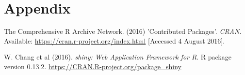 \documentclass[12pt]{article} %
\begin{document}
\clearpage

\section*{Appendix}

\begin{thebibliography}{59}
\begin{singlespace}

The Comprehensive R Archive Network. (2016) 'Contributed Packages'. \emph{CRAN}.
Available: \url{https://cran.r-project.org/index.html} 
[Accessed 4 August 2016].

W. Chang et al (2016).
\emph{shiny: Web Application Framework for R}. R package version 0.13.2.
\url{https://CRAN.R-project.org/package=shiny}

\end{singlespace}
\end{thebibliography}
\end{document}
